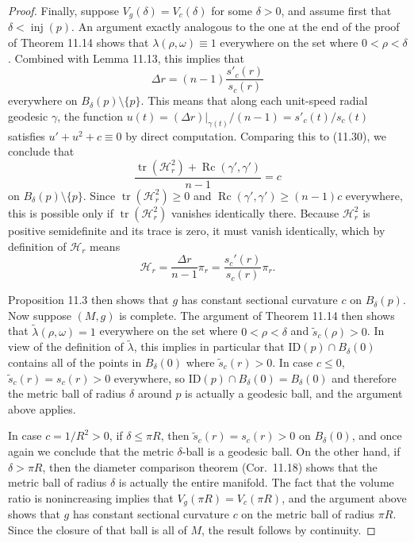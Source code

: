 \begin{theorem}
\begin{proof}
Finally, suppose $V_g(\delta) = V_c(\delta)$ for some $\delta > 0$, and assume first that $\delta < \operatorname{inj}(p)$. An argument exactly analogous to the one at the end of the proof of Theorem 11.14 shows that $\lambda(\rho,\omega) \equiv 1$ everywhere on the set where $0 < \rho < \delta$. Combined with Lemma 11.13, this implies that
\begin{equation}
\Delta r = (n-1)\frac{s'_c(r)}{s_c(r)} \tag{11.33}
\end{equation}
everywhere on $B_\delta(p) \setminus \{p\}$. This means that along each unit-speed radial geodesic $\gamma$, the function $u(t) = (\Delta r)|_{\gamma(t)}/(n-1) = s'_c(t)/s_c(t)$ satisfies $u' + u^2 + c \equiv 0$ by direct computation. Comparing this to (11.30), we conclude that
\[
\frac{\operatorname{tr}(\mathcal{H}_r^2) + \operatorname{Rc}(\gamma', \gamma')}{n-1} = c
\]
on $B_\delta(p) \setminus \{p\}$. Since $\operatorname{tr}(\mathcal{H}_r^2) \geq 0$ and $\operatorname{Rc}(\gamma', \gamma') \geq (n-1)c$ everywhere, this is possible only if $\operatorname{tr}(\mathcal{H}_r^2)$ vanishes identically there. Because $\mathcal{H}_r^2$ is positive semidefinite and its trace is zero, it must vanish identically, which by definition of $\mathcal{H}_r$ means
\[
\mathcal{H}_r = \frac{\Delta r}{n-1}\pi_r = \frac{s_c'(r)}{s_c(r)}\pi_r.
\]

Proposition 11.3 then shows that $g$ has constant sectional curvature $c$ on $B_\delta(p)$.
Now suppose $(M,g)$ is complete. The argument of Theorem 11.14 then shows that $\tilde{\lambda}(\rho,\omega) = 1$ everywhere on the set where $0 < \rho < \delta$ and $\tilde{s}_c(\rho) > 0$. In view of the definition of $\tilde{\lambda}$, this implies in particular that $\mathrm{ID}(p) \cap B_\delta(0)$ contains all of the points in $B_\delta(0)$ where $\tilde{s}_c(r) > 0$. In case $c \le 0$, $\tilde{s}_c(r) = s_c(r) > 0$ everywhere, so $\mathrm{ID}(p) \cap B_\delta(0) = B_\delta(0)$ and therefore the metric ball of radius $\delta$ around $p$ is actually a geodesic ball, and the argument above applies.

In case $c = 1/R^2 > 0$, if $\delta \le \pi R$, then $\tilde{s}_c(r) = s_c(r) > 0$ on $B_\delta(0)$, and once again we conclude that the metric $\delta$-ball is a geodesic ball. On the other hand, if $\delta > \pi R$, then the diameter comparison theorem (Cor.\ 11.18) shows that the metric ball of radius $\delta$ is actually the entire manifold. The fact that the volume ratio is nonincreasing implies that $V_g(\pi R) = V_c(\pi R)$, and the argument above shows that $g$ has constant sectional curvature $c$ on the metric ball of radius $\pi R$. Since the closure of that ball is all of $M$, the result follows by continuity.
\end{proof}
\end{theorem}

